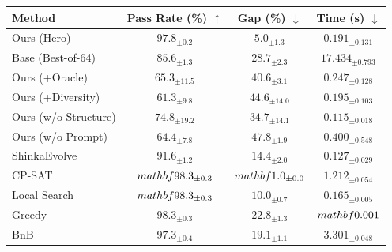 \begin{tabular}{lccc}
\toprule
Method & Pass Rate (\%) $\uparrow$ & Gap (\%) $\downarrow$ & Time (s) $\downarrow$ \\
\midrule
Ours (Hero) & $97.8_{\pm 0.2}$ & $5.0_{\pm 1.3}$ & $0.191_{\pm 0.131}$ \\
Base (Best-of-64) & $85.6_{\pm 1.3}$ & $28.7_{\pm 2.3}$ & $17.434_{\pm 0.793}$ \\
Ours (+Oracle) & $65.3_{\pm 11.5}$ & $40.6_{\pm 3.1}$ & $0.247_{\pm 0.128}$ \\
Ours (+Diversity) & $61.3_{\pm 9.8}$ & $44.6_{\pm 14.0}$ & $0.195_{\pm 0.103}$ \\
Ours (w/o Structure) & $74.8_{\pm 19.2}$ & $34.7_{\pm 14.1}$ & $0.115_{\pm 0.018}$ \\
Ours (w/o Prompt) & $64.4_{\pm 7.8}$ & $47.8_{\pm 1.9}$ & $0.400_{\pm 0.548}$ \\
ShinkaEvolve & $91.6_{\pm 1.2}$ & $14.4_{\pm 2.0}$ & $0.127_{\pm 0.029}$ \\
CP-SAT & $\\mathbf{98.3_{\pm 0.3}}$ & $\\mathbf{1.0_{\pm 0.0}}$ & $1.212_{\pm 0.054}$ \\
Local Search & $\\mathbf{98.3_{\pm 0.3}}$ & $10.0_{\pm 0.7}$ & $0.165_{\pm 0.005}$ \\
Greedy & $98.3_{\pm 0.3}$ & $22.8_{\pm 1.3}$ & $\\mathbf{0.001}$ \\
BnB & $97.3_{\pm 0.4}$ & $19.1_{\pm 1.1}$ & $3.301_{\pm 0.048}$ \\
\bottomrule
\end{tabular}
